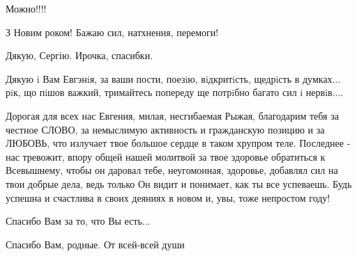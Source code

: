 \begin{itemize}
Можно!!!!

З Новим роком! Бажаю сил, натхнення, перемоги!

Дякую, Сергію. Ирочка, спасибки.

Дякую i Вам Евгэнiя, за ваши пости, поезiю, вiдкритiсть, щедрiсть в думках...
рiк, що пiшов важкий, тримайтесь попереду ще потрiбно багато сил i нервiв....


Дорогая для всех нас Евгения, милая, несгибаемая Рыжая, благодарим тебя за
честное СЛОВО, за немыслимую активность и гражданскую позицию и за ЛЮБОВЬ, что
излучает твое большое сердце в таком хрупром теле. Последнее - нас тревожит,
впору общей нашей молитвой за твое здоровье обратиться к Всевышнему, чтобы он
даровал тебе, неугомонная, здоровье, добавлял сил на твои добрые дела, ведь
только Он видит и понимает, как ты все успеваешь. Будь успешна и счастлива в
своих деяниях в новом и, увы, тоже непростом году!


Спасибо Вам за то, что Вы есть...

Спасибо Вам, родные. От всей-всей души

\end{itemize}

